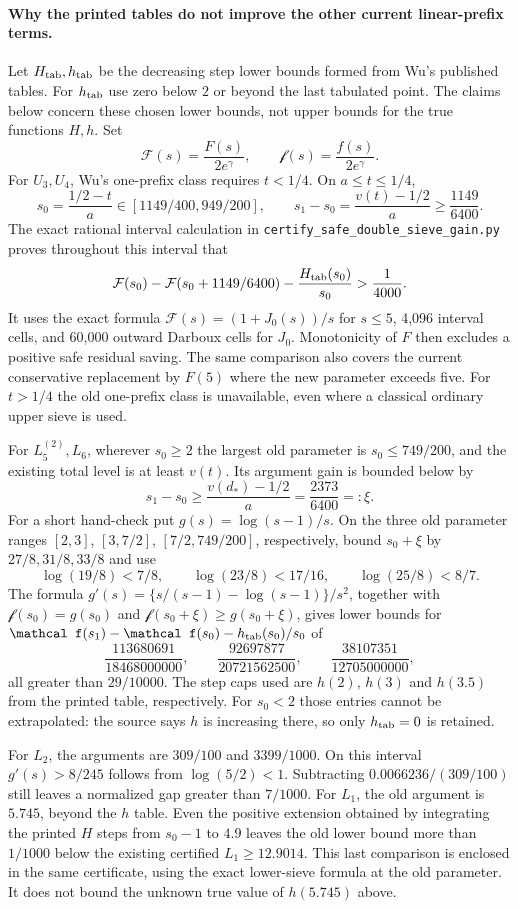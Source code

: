 \documentclass[11pt]{article}
\begin{document}
\paragraph{Why the printed tables do not improve the other current
linear-prefix terms.}
Let $H_{\rm tab},h_{\rm tab}$ be the decreasing step lower bounds
formed from Wu's published tables.  For $h_{\rm tab}$ use zero
below $2$ or beyond the last tabulated point.  The claims below
concern these chosen lower bounds, not upper bounds for the true
functions $H,h$.  Set
\[
 \mathcal F(s)=\frac{F(s)}{2e^\gamma},\qquad
 \mathcal f(s)=\frac{f(s)}{2e^\gamma}.
\]
For $U_3,U_4$, Wu's one-prefix class requires $t<1/4$.
On $a\le t\le1/4$,
\[
 s_0=\frac{1/2-t}{a}\in[1149/400,949/200],\qquad
 s_1-s_0=\frac{v(t)-1/2}{a}\ge\frac{1149}{6400}.
\]
The exact rational interval calculation in
\texttt{certify\_safe\_double\_sieve\_gain.py} proves throughout this
interval that
\[
 \mathcal F(s_0)-\mathcal F(s_0+1149/6400)
       -\frac{H_{\rm tab}(s_0)}{s_0}>\frac1{4000}.
\]
It uses the exact formula $\mathcal F(s)=(1+J_0(s))/s$ for $s\le5$,
4,096 interval cells, and 60,000 outward Darboux cells for $J_0$.
Monotonicity of $F$ then excludes a positive safe residual saving.
The same comparison also covers the current conservative replacement
by $F(5)$ where the new parameter exceeds five.  For $t>1/4$
the old one-prefix class is unavailable, even where a classical
ordinary upper sieve is used.

For $L_5^{(2)},L_6$, wherever $s_0\ge2$ the largest old parameter is
$s_0\le749/200$, and the existing total level is at least $v(t)$.
Its argument gain is bounded below by
\[
 s_1-s_0\ge\frac{v(d_*)-1/2}{a}=\frac{2373}{6400}=:\xi.
\]
For a short hand-check put $g(s)=\log(s-1)/s$.  On the three old
parameter ranges $[2,3]$, $[3,7/2]$, $[7/2,749/200]$, respectively,
bound $s_0+\xi$ by $27/8,31/8,33/8$ and use
\[
 \log(19/8)<7/8,\qquad \log(23/8)<17/16,\qquad
 \log(25/8)<8/7.
\]
The formula
$g'(s)=\{s/(s-1)-\log(s-1)\}/s^2$, together with
$\mathcal f(s_0)=g(s_0)$ and $\mathcal f(s_0+\xi)\ge g(s_0+\xi)$,
gives lower bounds for
$\mathcal f(s_1)-\mathcal f(s_0)-h_{\rm tab}(s_0)/s_0$ of
\[
 \frac{113680691}{18468000000},\qquad
 \frac{92697877}{20721562500},\qquad
 \frac{38107351}{12705000000},
\]
all greater than $29/10000$.  The step caps used are
$h(2)$, $h(3)$ and $h(3.5)$ from the printed table, respectively.
For $s_0<2$ those entries cannot be extrapolated: the source says
$h$ is increasing there, so only $h_{\rm tab}=0$ is retained.

For $L_2$, the arguments are $309/100$ and $3399/1000$.
On this interval $g'(s)>8/245$ follows from $\log(5/2)<1$.
Subtracting $0.0066236/(309/100)$ still leaves a normalized gap
greater than $7/1000$.  For $L_1$, the old argument is $5.745$,
beyond the $h$ table.  Even the positive extension obtained by
integrating the printed $H$ steps from $s_0-1$ to $4.9$ leaves
the old lower bound more than $1/1000$ below the existing certified
$L_1\ge12.9014$.  This last comparison is enclosed in the same
certificate, using the exact lower-sieve formula at the old parameter.
It does not bound the unknown true value of $h(5.745)$ above.
\end{document}
